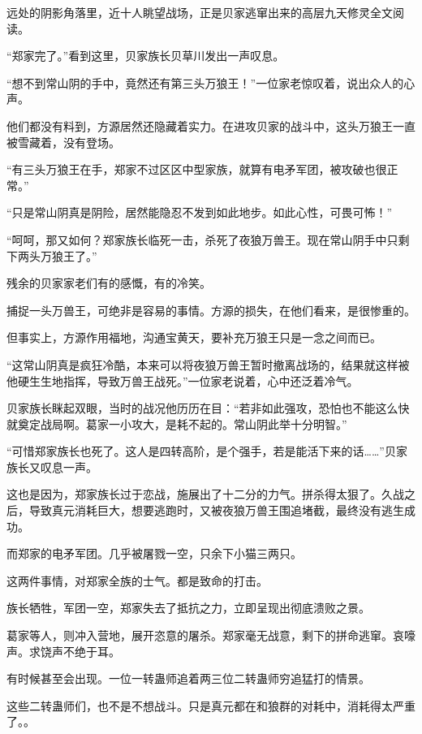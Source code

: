 
\begin{this_body}

远处的阴影角落里，近十人眺望战场，正是贝家逃窜出来的高层九天修灵全文阅读。

“郑家完了。”看到这里，贝家族长贝草川发出一声叹息。

“想不到常山阴的手中，竟然还有第三头万狼王！”一位家老惊叹着，说出众人的心声。

他们都没有料到，方源居然还隐藏着实力。在进攻贝家的战斗中，这头万狼王一直被雪藏着，没有登场。

“有三头万狼王在手，郑家不过区区中型家族，就算有电矛军团，被攻破也很正常。”

“只是常山阴真是阴险，居然能隐忍不发到如此地步。如此心性，可畏可怖！”

“呵呵，那又如何？郑家族长临死一击，杀死了夜狼万兽王。现在常山阴手中只剩下两头万狼王了。”

残余的贝家家老们有的感慨，有的冷笑。

捕捉一头万兽王，可绝非是容易的事情。方源的损失，在他们看来，是很惨重的。

但事实上，方源作用福地，沟通宝黄天，要补充万狼王只是一念之间而已。

“这常山阴真是疯狂冷酷，本来可以将夜狼万兽王暂时撤离战场的，结果就这样被他硬生生地指挥，导致万兽王战死。”一位家老说着，心中还泛着冷气。

贝家族长眯起双眼，当时的战况他历历在目：“若非如此强攻，恐怕也不能这么快就奠定战局啊。葛家一小攻大，是耗不起的。常山阴此举十分明智。”

“可惜郑家族长也死了。这人是四转高阶，是个强手，若是能活下来的话……”贝家族长又叹息一声。

这也是因为，郑家族长过于恋战，施展出了十二分的力气。拼杀得太狠了。久战之后，导致真元消耗巨大，想要逃跑时，又被夜狼万兽王围追堵截，最终没有逃生成功。

而郑家的电矛军团。几乎被屠戮一空，只余下小猫三两只。

这两件事情，对郑家全族的士气。都是致命的打击。

族长牺牲，军团一空，郑家失去了抵抗之力，立即呈现出彻底溃败之景。

葛家等人，则冲入营地，展开恣意的屠杀。郑家毫无战意，剩下的拼命逃窜。哀嚎声。求饶声不绝于耳。

有时候甚至会出现。一位一转蛊师追着两三位二转蛊师穷追猛打的情景。

这些二转蛊师们，也不是不想战斗。只是真元都在和狼群的对耗中，消耗得太严重了。。


\end{this_body}
